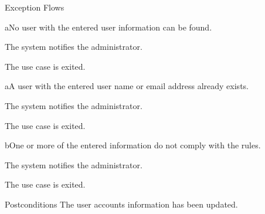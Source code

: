 %
\begin{cpartList}{Exception Flows}
  \begin{innerList}{4}{a}{No user with the entered user information can be found.}
    \item The system notifies the administrator.
    \item The use case is exited.
  \end{innerList}

  \begin{innerList}{7}{a}{A user with the entered user name or email address already exists.}
    \item The system notifies the administrator.
    \item The use case is exited.
  \end{innerList}

  \begin{innerList}{7}{b}{One or more of the entered information do not comply with the rules.}
    \item The system notifies the administrator.
    \item The use case is exited.
  \end{innerList}
\end{cpartList}

%
\begin{cpart}{Postconditions}
The user accounts information has been updated.
\end{cpart}

